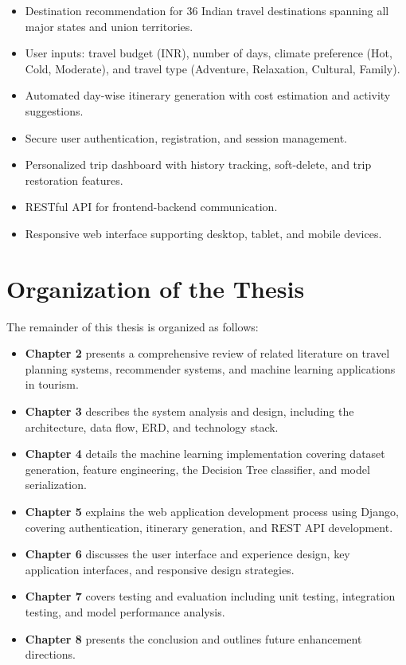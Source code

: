 \begin{itemize}
    \item Destination recommendation for 36 Indian travel destinations spanning all major states and union territories.
    \item User inputs: travel budget (INR), number of days, climate preference (Hot, Cold, Moderate), and travel type (Adventure, Relaxation, Cultural, Family).
    \item Automated day-wise itinerary generation with cost estimation and activity suggestions.
    \item Secure user authentication, registration, and session management.
    \item Personalized trip dashboard with history tracking, soft-delete, and trip restoration features.
    \item RESTful API for frontend-backend communication.
    \item Responsive web interface supporting desktop, tablet, and mobile devices.
\end{itemize}

\section{Organization of the Thesis}

The remainder of this thesis is organized as follows:

\begin{itemize}
    \item \textbf{Chapter 2} presents a comprehensive review of related literature on travel planning systems, recommender systems, and machine learning applications in tourism.
    \item \textbf{Chapter 3} describes the system analysis and design, including the architecture, data flow, ERD, and technology stack.
    \item \textbf{Chapter 4} details the machine learning implementation covering dataset generation, feature engineering, the Decision Tree classifier, and model serialization.
    \item \textbf{Chapter 5} explains the web application development process using Django, covering authentication, itinerary generation, and REST API development.
    \item \textbf{Chapter 6} discusses the user interface and experience design, key application interfaces, and responsive design strategies.
    \item \textbf{Chapter 7} covers testing and evaluation including unit testing, integration testing, and model performance analysis.
    \item \textbf{Chapter 8} presents the conclusion and outlines future enhancement directions.
\end{itemize}
